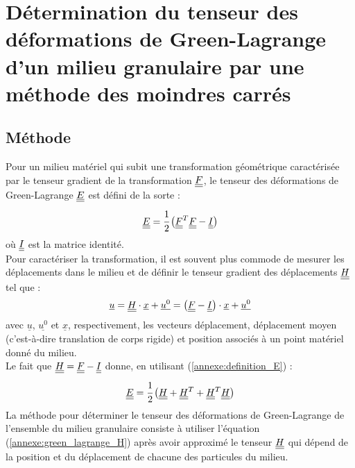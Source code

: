 \chapter[Déformations mésoscopiques du milieu granulaire]{Détermination du tenseur des déformations de Green-Lagrange d'un milieu granulaire par une méthode des moindres carrés}
\label{annexe:deformations}

\section*{Méthode}
Pour un milieu matériel qui subit une transformation géométrique caractérisée par le tenseur gradient de la transformation $\underline{\underline{F}}$, le tenseur des déformations de Green-Lagrange $\underline{\underline{E}}$ est défini de la sorte :
\begin{equation}\label{annexe:definition_E}
	\underline{\underline{E}}
	= \cfrac{1}{2} \left( \underline{\underline{F}}^T \underline{\underline{F}} - \underline{\underline{I}} \right)
\end{equation}
où $\underline{\underline{I}}$ est la matrice identité.
\\Pour caractériser la transformation, il est souvent plus commode de mesurer les déplacements dans le milieu et de définir le tenseur gradient des déplacements $\underline{\underline{H}}$ tel que :
\begin{equation}\label{annexe:gradient_deplacements}
\underline{u}
= \underline{\underline{H}} \cdot \underline{x} + \underline{u^0}
= \left( \underline{\underline{F}} - \underline{\underline{I}} \right) \cdot \underline{x} + \underline{u^0}
\end{equation}
avec $\underline{u}$, $\underline{u^0}$ et $\underline{x}$, respectivement, les vecteurs déplacement, déplacement moyen (c'est-à-dire translation de corps rigide) et position associés à un point matériel donné du milieu.
\\Le fait que $\underline{\underline{H}} = \underline{\underline{F}} - \underline{\underline{I}}$ donne, en utilisant (\ref{annexe:definition_E}) :
\begin{equation}\label{annexe:green_lagrange_H}
\underline{\underline{E}} = \cfrac{1}{2} \left( \underline{\underline{H}} + \underline{\underline{H}}^T + \underline{\underline{H}}^T\underline{\underline{H}} \right)
\end{equation}
La méthode pour déterminer le tenseur des déformations de Green-Lagrange de l'ensemble du milieu granulaire consiste à utiliser l'équation (\ref{annexe:green_lagrange_H}) après avoir approximé le tenseur $\underline{\underline{H}}$ qui dépend de la position et du déplacement de chacune des particules du milieu.

